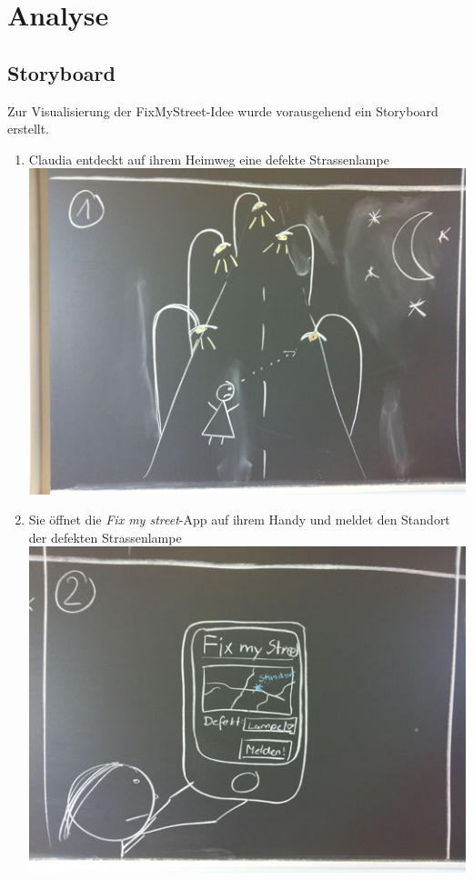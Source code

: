 \section{Analyse}

\subsection{Storyboard}
Zur Visualisierung der FixMyStreet-Idee wurde vorausgehend ein Storyboard erstellt.

\begin{enumerate}
\item Claudia entdeckt auf ihrem Heimweg eine defekte Strassenlampe \\ \includegraphics[scale=0.4]{images/usecase2-fixmystreet/storyboard/fixmystreet-storyboard-1.jpg}
\item Sie öffnet die \emph{Fix my street}-App auf ihrem Handy und meldet den Standort der defekten Strassenlampe \\ \includegraphics[scale=0.4]{images/usecase2-fixmystreet/storyboard/fixmystreet-storyboard-2.jpg}

\end{enumerate}
